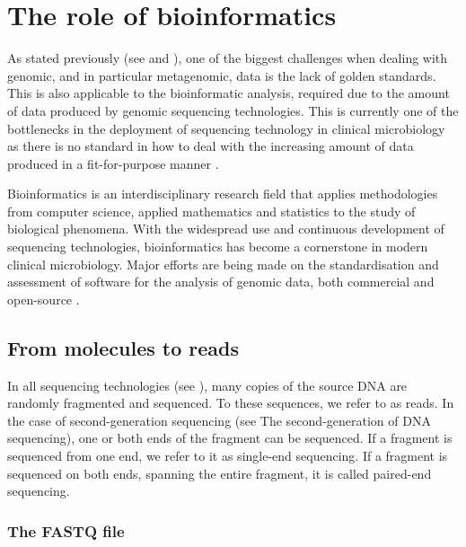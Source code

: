 \section{The role of bioinformatics} \label{sec:_intro_bioinformatics}

As stated previously (see  and ), one of the biggest challenges when dealing with genomic, and in particular metagenomic, data is the lack of golden standards. This is also applicable to the bioinformatic analysis, required due to the amount of data produced by genomic sequencing technologies. This is currently one of the bottlenecks in the deployment of sequencing technology in clinical microbiology as there is no standard in how to deal with the increasing amount of data produced in a fit-for-purpose manner \citep{carrico_primer_2018}.

Bioinformatics is an interdisciplinary research field that applies methodologies from computer science, applied mathematics and statistics to the study of biological phenomena\citep{carrico_primer_2018}. With the widespread use and continuous development of sequencing technologies, bioinformatics has become a cornerstone in modern clinical microbiology. 
Major efforts are being made on the standardisation and assessment of software for the analysis of genomic data, both commercial and open-source \cite{angers-loustau_challenges_2018, gruening_recommendations_2019, sczyrba_critical_2017, couto_critical_2018}. 

\subsection{From molecules to reads}

In all sequencing technologies (see ), many copies of the source DNA are randomly fragmented and sequenced. To these sequences, we refer to as reads. In the case of second-generation sequencing (see  The second-generation of DNA sequencing), one or both ends of the fragment can be sequenced. If a fragment is sequenced from one end, we refer to it as single-end sequencing. If a fragment is sequenced on both ends, spanning the entire fragment, it is called paired-end sequencing.

\subsubsection{The FASTQ file} \label{sssec:_intro_fastq}

